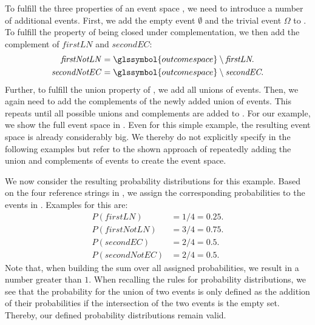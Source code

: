 To fulfill the three properties of an \gls{event space} , we need to introduce a number of additional \glspl{event}.
First, we add the empty \gls{event} $\emptyset$ and the trivial \gls{event} $\Omega$ to .
To fulfill the property of  being closed under complementation, we then add the complement of $\mathit{firstLN}$ and $\mathit{secondEC}$:
\begin{equation*}
  \begin{split}
    \mathit{firstNotLN}&=\glssymbol{outcome space}\setminus\textit{firstLN}.\\
    \mathit{secondNotEC}&=\glssymbol{outcome space}\setminus\textit{secondEC}.\\
  \end{split}
\end{equation*}
Further, to fulfill the union property of , we add all unions of \glspl{event}.
Then, we again need to add the complements of the newly added union of \glspl{event}.
This repeats until all possible unions and complements are added to .
For our example, we show the full \gls{event space}  in .
Even for this simple example, the resulting \gls{event space} is already considerably big.
We thereby do not explicitly specify  in the following examples but refer to the shown approach of repeatedly adding the union and complements of \glspl{event} to create the \gls{event space}.

We now consider the resulting \glspl{probability distribution} for this example.
Based on the four reference strings in , we assign the corresponding probabilities to the events in .
Examples for this are:
\begin{equation*}
    \begin{split}
      P(\mathit{firstLN})&=1/4=0.25.\\
      P(\mathit{firstNotLN})&=3/4=0.75.\\
      P(\mathit{secondEC})&=2/4=0.5.\\
      P(\mathit{secondNotEC})&=2/4=0.5.
    \end{split}
\end{equation*}
Note that, when building the sum over all assigned probabilities, we result in a number greater than $1$.
When recalling the rules for \glspl{probability distribution}, we see that the probability for the union of two \glspl{event} is only defined as the addition of their probabilities if the intersection of the two events is the empty set.
Thereby, our defined \glspl{probability distribution} remain valid.

